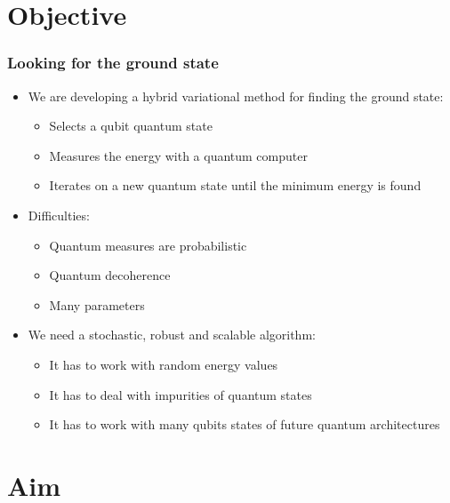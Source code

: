 \documentclass[10pt,t,xcolor=dvipsnames,aspectratio=169]{beamer}
\begin{document}
\section{Objective}

\begin{frame}
    \frametitle{Looking for the ground state}
    \begin{itemize}
        \item
            We are developing a hybrid variational method for finding the ground state:
            \begin{itemize}
                \item Selects a qubit quantum state
                \item Measures the energy with a quantum computer
                \item Iterates on a new quantum state until the minimum energy is found
            \end{itemize}
        \item
            Difficulties:
            \begin{itemize}
                \item Quantum measures are probabilistic
                \item Quantum decoherence
                \item Many parameters
            \end{itemize}
        \item
            We need a stochastic, robust and scalable algorithm:
            \begin{itemize}
                \item It has to work with random energy values
                \item It has to deal with impurities of quantum states
                \item It has to work with many qubits states of future quantum architectures
            \end{itemize}
    \end{itemize}
\end{frame}

\section{Aim}
\end{document}
